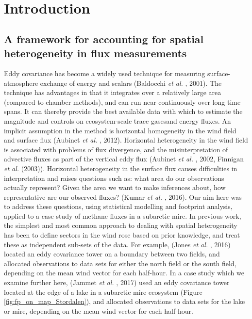 \section{Introduction}\label{introduction}

\subsection{A framework for accounting for spatial heterogeneity in flux
measurements}\label{a-framework-for-accounting-for-spatial-heterogeneity-in-flux-measurements}

Eddy covariance has become a widely used technique for measuring
surface-atmosphere exchange of energy and scalars (Baldocchi \emph{et
al.} , 2001). The technique has advantages in that it integrates over a
relatively large area (compared to chamber methods), and can run
near-continuously over long time spans. It can thereby provide the best
available data with which to estimate the magnitude and controls on
ecosystem-scale trace gasesand energy fluxes. An implicit assumption in
the method is horizontal homogeneity in the wind field and surface flux
(Aubinet \emph{et al.} , 2012). Horizontal heterogeneity in the wind
field is associated with problems of flux divergence, and the
misinterpretation of advective fluxes as part of the vertical eddy flux
(Aubinet \emph{et al.} , 2002, Finnigan \emph{et al.} (2003)). Horizontal
heterogeneity in the surface flux causes difficulties in interpretation
and raises questions such as: what area do our observations actually
represent? Given the area we want to make inferences about, how
representative are our observed fluxes? (Kumar \emph{et al.} , 2016). Our
aim here was to address these questions, using statistical modelling and
footprint analysis, applied to a case study of methane fluxes in a
subarctic mire.
\cite{Schaepman-Strub2009}
In previous work, the simplest and most common approach to dealing with
spatial heterogeneity has been to define sectors in the wind rose based
on prior knowledge, and treat these as independent sub-sets of the data.
For example, (Jones \emph{et al.} , 2016) located an eddy covariance
tower on a boundary between two fields, and allocated observations to
data sets for either the north field or the south field, depending on
the mean wind vector for each half-hour. In a case study which we
examine further here, (Jammet \emph{et al.} , 2017) used an eddy
covariance tower located at the edge of a lake in a subarctic mire
ecosystem (Figure \ref{fig:fp_on_map_Stordalen}), and allocated
observations to data sets for the lake or mire, depending on the mean
wind vector for each half-hour.

